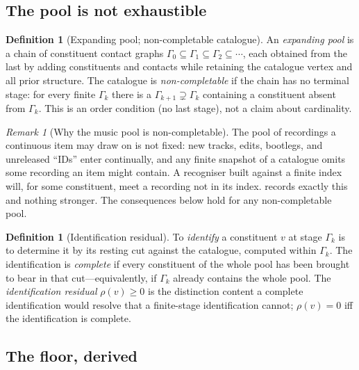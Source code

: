 \documentclass[11pt,twocolumn,a4paper]{article}
\theoremstyle{thmstyle}
\theoremstyle{definition}
\newtheorem{definition}[theorem]{Definition}
\theoremstyle{remark}
\newtheorem{remark}[theorem]{Remark}
\newcommand{\Gph}{\Gamma}
\newcommand{\res}{\rho}
\begin{document}
\subsection{The pool is not exhaustible}

\begin{definition}[Expanding pool; non-completable catalogue]
\label{def:noncompletable}
An \emph{expanding pool} is a chain of constituent contact graphs
$\Gph_0\subseteq\Gph_1\subseteq\Gph_2\subseteq\cdots$, each obtained from the
last by adding constituents and contacts while retaining the catalogue vertex
and all prior structure. The catalogue is \emph{non-completable} if the chain
has no terminal stage: for every finite $\Gph_k$ there is a
$\Gph_{k+1}\supsetneq\Gph_k$ containing a constituent absent from $\Gph_k$. This
is an order condition (no last stage), not a claim about cardinality.
\end{definition}

\begin{remark}[Why the music pool is non-completable]
\label{rem:why-open}
The pool of recordings a continuous item may draw on is not fixed: new tracks,
edits, bootlegs, and unreleased ``IDs'' enter continually, and any finite
snapshot of a catalogue omits some recording an item might contain. A recogniser
built against a finite index will, for some constituent, meet a recording not in
its index.  records exactly this and nothing stronger.
The consequences below hold for any non-completable pool.
\end{remark}

\begin{definition}[Identification residual]
\label{def:residual}
To \emph{identify} a constituent $v$ at stage $\Gph_k$ is to determine it by its
resting cut against the catalogue, computed within $\Gph_k$. The identification
is \emph{complete} if every constituent of the whole pool has been brought to
bear in that cut---equivalently, if $\Gph_k$ already contains the whole pool.
The \emph{identification residual} $\res(v)\ge0$ is the distinction content a
complete identification would resolve that a finite-stage identification cannot;
$\res(v)=0$ iff the identification is complete.
\end{definition}

\subsection{The floor, derived}
\end{document}
